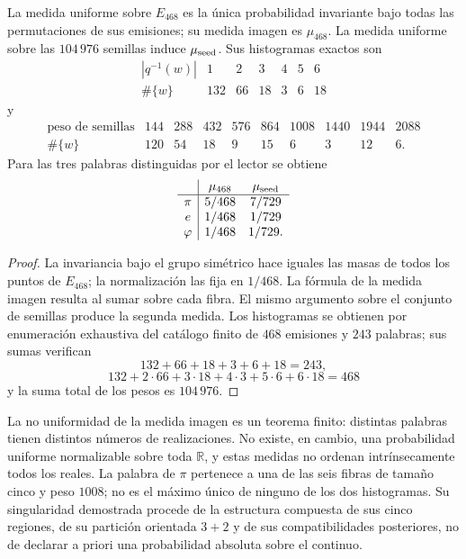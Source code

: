 \begin{theorem}
\label{thm:medidas-emisor-468}
La medida uniforme sobre \(E_{468}\) es la única probabilidad invariante bajo
todas las permutaciones de sus emisiones; su medida imagen es \(\mu_{468}\).
La medida uniforme sobre las \(104\,976\) semillas induce
\(\mu_{\rm seed}\). Sus histogramas exactos son
\[
\begin{array}{c|rrrrrr}
|q^{-1}(w)|&1&2&3&4&5&6\\ \hline
\#\{w\}&132&66&18&3&6&18
\end{array}
\]
y
\[
\begin{array}{c|rrrrrrrrr}
\text{peso de semillas}
&144&288&432&576&864&1008&1440&1944&2088\\ \hline
\#\{w\}
&120&54&18&9&15&6&3&12&6.
\end{array}
\]
Para las tres palabras distinguidas por el lector se obtiene
\[
\begin{array}{c|cc}
&\mu_{468}&\mu_{\rm seed}\\ \hline
\pi&5/468&7/729\\
e&1/468&1/729\\
\varphi&1/468&1/729.
\end{array}
\]
\end{theorem}

\begin{proof}
La invariancia bajo el grupo simétrico hace iguales las masas de todos los
puntos de \(E_{468}\); la normalización las fija en \(1/468\). La fórmula de
la medida imagen resulta al sumar sobre cada fibra. El mismo argumento sobre el
conjunto de semillas produce la segunda medida. Los histogramas se obtienen
por enumeración exhaustiva del catálogo finito de \(468\) emisiones y \(243\)
palabras; sus sumas verifican
\[
132+66+18+3+6+18=243,
\]
\[
132+2\cdot66+3\cdot18+4\cdot3+5\cdot6+6\cdot18=468
\]
y la suma total de los pesos es \(104\,976\).
\end{proof}

La no uniformidad de la medida imagen es un teorema finito: distintas palabras
tienen distintos números de realizaciones. No existe, en cambio, una
probabilidad uniforme normalizable sobre toda \(\mathbb R\), y estas medidas
no ordenan intrínsecamente todos los reales. La palabra de \(\pi\) pertenece
a una de las seis fibras de tamaño cinco y peso \(1008\); no es el máximo
único de ninguno de los dos histogramas. Su singularidad demostrada procede
de la estructura compuesta de sus cinco regiones, de su partición orientada
\(3+2\) y de sus compatibilidades posteriores, no de declarar a priori una
probabilidad absoluta sobre el continuo.


